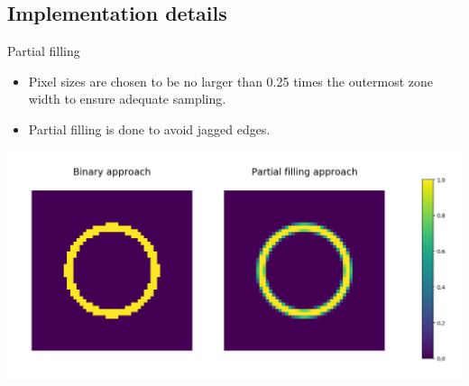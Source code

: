 \documentclass{beamer}
\begin{document}
\subsection{Implementation details}
\begin{frame}{Partial filling}
\begin{itemize}
	\item Pixel sizes are chosen to be no larger than 0.25 times the outermost zone width to ensure adequate sampling.
	\item Partial filling is done to avoid jagged edges. 
\end{itemize}
\begin{center}
\includegraphics[scale=0.25]{partial_fill}
\end{center}
\end{frame}
\end{document}
